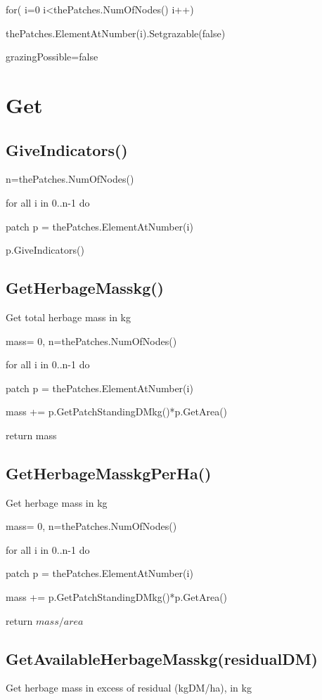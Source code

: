 \documentclass[%
]{scrartcl}
\begin{document}
{{    \quad
	   for( i=0 i<thePatches.NumOfNodes() i++)
	   
	 \quad	  \quad	  	 thePatches.ElementAtNumber(i).Setgrazable(false)

    \quad	 \quad	   grazingPossible=false
   


\section{Get}

\subsection{GiveIndicators()}
   n=thePatches.NumOfNodes()
   
     for all i in 0..n-1 do
   
   \quad   patch  p = thePatches.ElementAtNumber(i)
      
   \quad   p.GiveIndicators()



\subsection{GetHerbageMasskg()}
Get total herbage mass in kg

	mass= 0,	
    n=thePatches.NumOfNodes()
    
     for all i in 0..n-1 do
   
  \quad   patch  p = thePatches.ElementAtNumber(i)
      
 \quad     mass += p.GetPatchStandingDMkg()*p.GetArea()
      
   return mass


\subsection{GetHerbageMasskgPerHa()}
Get herbage mass in kg

	mass= 0, n=thePatches.NumOfNodes()
    
     for all i in 0..n-1 do
   
  \quad    patch  p = thePatches.ElementAtNumber(i)
      
 \quad     mass += p.GetPatchStandingDMkg()*p.GetArea()
      
   return $mass/area$
   
   


\subsection{GetAvailableHerbageMasskg(residualDM)}
Get herbage mass in excess of residual (kgDM/ha),  in kg

}}
\end{document}
